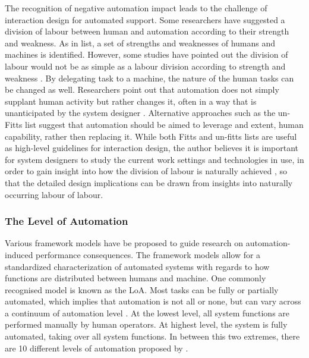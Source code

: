 The recognition of negative automation impact leads to the challenge of interaction design for automated support.  Some researchers have suggested a division of labour between human and automation according to their strength and weakness. As in \cite{Fitts} list, a set of strengths and weaknesses of humans and machines is identified. However, some studies have pointed out the division of labour would not be as simple as a labour division according to strength and weakness \citep{Bradshaw2011}. By delegating task to a machine, the nature of the human tasks can be changed as well. Researchers point out that automation does not simply supplant human activity but rather changes it, often in a way that is unanticipated by the system designer \citep{Bradshaw2011}. Alternative approaches such as the un-Fitts list \citep{Hoffman2002} suggest that automation should be aimed to leverage and extent, human capability, rather then replacing it.  While both Fitts and un-fitts lists are useful as high-level guidelines for interaction design, the author believes it is important for system designers to study the current work settings and technologies in use, in order to gain insight into how the division of labour is naturally achieved \citep{Crabtree2012}, so that the detailed design implications can be drawn from insights into naturally occurring labour of labour. \\


\subsubsection{The Level of Automation}\label{sec:lrloa}
Various framework models have be proposed to guide research on automation-induced performance consequences. The framework models allow for a standardized characterization of automated systems with regards to how functions are distributed between humans and machine. One commonly recognised model is known as the \acf{LoA}. Most tasks can be fully or partially automated, which implies that automation is not all or none, but can vary across a continuum of automation level \citep{Wickens2010}. At the lowest level, all system functions are performed manually by human operators.  At highest level, the system is fully automated, taking over all system functions. In between this two extremes, there are 10 different levels of automation proposed by \citep{Wickens2010}. \\

